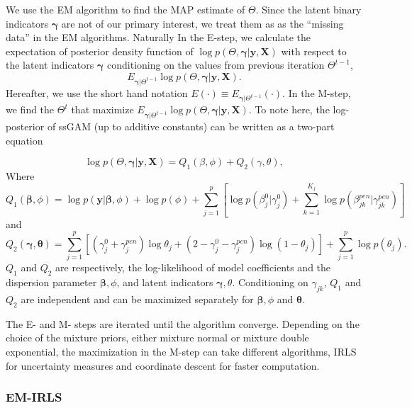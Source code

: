 \documentclass[AMA,STIX1COL,]{WileyNJD-v2}
\begin{document}
We use the EM algorithm to find the MAP estimate of \(\Theta\). Since
the latent binary indicators \(\boldsymbol{\gamma}\) are not of our
primary interest, we treat them as as the ``missing data'' in the EM
algorithms. Naturally In the E-step, we calculate the expectation of
posterior density function of
\(\log p(\Theta, \boldsymbol{\gamma}| \textbf{y}, \textbf{X})\) with
respect to the latent indicators \(\boldsymbol{\gamma}\) conditioning on
the values from previous iteration \(\Theta^{t-1}\), \[
E_{\boldsymbol{\gamma}|\Theta^{t-1}}\log p(\Theta, \boldsymbol{\gamma}| \textbf{y}, \textbf{X}) .
\] Hereafter, we use the short hand notation
\(E(\cdot)\equiv E_{\boldsymbol{\gamma}|\Theta^{t-1}}(\cdot)\). In the
M-step, we find the \(\Theta^{t}\) that maximize
\(E_{\boldsymbol{\gamma}|\Theta^{t-1}}\log p(\Theta, \boldsymbol{\gamma}| \textbf{y}, \textbf{X})\).
To note here, the log-posterior of ssGAM (up to additive constants) can
be written as a two-part equation

\[ \log p(\Theta, \boldsymbol{\gamma}| \textbf{y}, \textbf{X}) = Q_1(\beta, \phi) + Q_2 (\gamma,\theta),\]
Where
\[ Q_1(\boldsymbol{\beta}, \phi) = \log p(\textbf{y}|\boldsymbol{\beta}, \phi) + \log p(\phi) + \sum\limits_{j=1}^p\left[\log p(\beta^0_j|\gamma^0_j)+\sum\limits_{k=1}^{K_j} \log p(\beta^{pen}_{jk}|\gamma^{pen}_{jk})\right]\]
and \[
Q_2(\boldsymbol{\gamma},\boldsymbol{\theta}) = \sum\limits_{j=1}^{p} \left[ (\gamma^0_j+\gamma_{j}^{pen})\log \theta_j + (2-\gamma^0_j-\gamma_{j}^{pen}) \log (1-\theta_j)\right] +  \sum\limits_{j=1}^{p}\log p(\theta_j) .\]
\(Q_1\) and \(Q_2\) are respectively, the log-likelihood of model
coefficients and the dispersion parameter \(\boldsymbol{\beta}, \phi\),
and latent indicators \(\boldsymbol{\gamma}, \theta\). Conditioning on
\(\gamma_{jk}\), \(Q_1\) and \(Q_2\) are independent and can be
maximized separately for \(\boldsymbol{\beta}, \phi\) and
\(\boldsymbol{\theta}\).

The E- and M- steps are iterated until the algorithm converge. Depending
on the choice of the mixture priors, either mixture normal or mixture
double exponential, the maximization in the M-step can take different
algorithms, IRLS for uncertainty measures and coordinate descent for
faster computation.

\hfill\break

\hypertarget{em-irls}{%
\subsubsection{EM-IRLS}\label{em-irls}}
\end{document}
